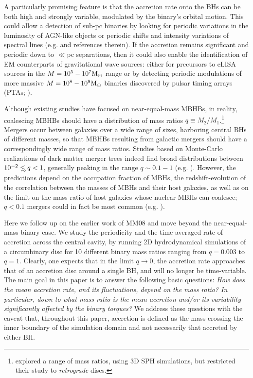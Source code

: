 A particularly promising feature is that the accretion rate onto the
BHs can be both high and strongly variable, modulated by the binary's
orbital motion. This could allow a detection of sub-pc binaries by
looking for periodic variations in the luminosity of AGN-like objects
\citep{HKM09} or periodic shifts and intensity variations of spectral
lines (e.g. \citealt{HKM09,SL2010,Eracleous:2011} and references
therein). If the accretion remains significant and periodic down to
$\ll$pc separations, then it could also enable the identification of
EM counterparts of gravitational wave sources: either for precursors
to eLISA sources in the $M=10^5-10^7{\rm M_\odot}$ range
\citep{Kocsis+2006,Kocsis+2008} or by detecting periodic modulations
of more massive $M=10^8-10^9{\rm M_\odot}$ binaries discovered by
pulsar timing arrays (PTAs; \citealt{Tanaka:2012,Sesana+2012}).

Although existing studies have focused on near-equal-mass MBHBs, in
reality, coalescing MBHBs should have a distribution of mass ratios
$q\equiv M_2/M_1$.\footnote{\citet{Nixon:2011:LongSim} explored a
  range of mass ratios, using 3D SPH simulations, but restricted their
  study to {\em retrograde} discs.}  Mergers occur between galaxies
over a wide range of sizes, harboring central BHs of different masses,
so that MBHBs resulting from galactic mergers should have a
correspondingly wide range of mass ratios.  Studies based on
Monte-Carlo realizations of dark matter merger trees indeed find broad
distributions between $10^{-2}\lsim q < 1$, generally peaking in the
range $q\sim 0.1-1$
(e.g. \citealt{Volonteri+2003,Sesana+2005,Sesana+2012,GergelyBiermann:2012}).
However, the predictions depend on the occupation fraction of MBHs,
the redshift-evolution of the correlation between the masses of MBHs
and their host galaxies, as well as on the limit on the mass ratio of
host galaxies whose nuclear MBHs can coalesce; $q<0.1$ mergers could
in fact be most common (e.g. \citealt{Lippai+2009}).

Here we follow up on the earlier work of MM08 and move beyond the
near-equal-mass binary case. We study the periodicity and the
time-averaged rate of accretion across the central cavity, by running
2D hydrodynamical simulations of a circumbinary disc for 10 different
binary mass ratios ranging from $q=0.003$ to $q=1$.  Clearly, one
expects that in the limit $q\rightarrow 0$, the accretion rate
approaches that of an accretion disc around a single BH, and will no
longer be time-variable.  The main goal in this paper is to answer the
following basic questions: {\em How does the mean accretion rate, and
  its fluctuations, depend on the mass ratio?  In particular, down to
  what mass ratio is the mean accretion and/or its variability
  significantly affected by the binary torques?} 
We address these questions with the caveat that, throughout this paper, accretion is defined as the mass 
crossing the inner boundary of the simulation domain and not necessarily 
that accreted by either BH.


